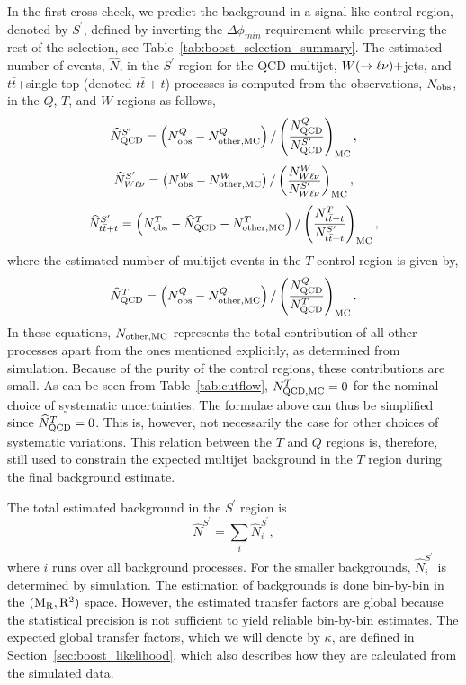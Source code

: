 In the first cross check, we predict the background in a signal-like control region, denoted by
$S^\prime$, defined by inverting the $\Delta\phi_{min}$ requirement while preserving the rest of the
selection, see Table~\ref{tab:boost_selection_summary}. 
The estimated number of events, $\widehat{N}$, in the $S^\prime$ region for the QCD multijet,
$W(\rightarrow \ell\nu)+$jets, and $t\bar{t}$+single top (denoted $t\bar{t}+t$) processes is
computed from the observations, $N_{\rm obs}$, in the $Q$, $T$, and $W$ regions as follows,
\begin{equation}
 \widehat{N}_{\rm QCD}^{S^\prime} = \left( N_{\rm obs}^{Q} - N_{{\rm other, MC}}^{Q} \right)  /
\left(
\frac{N_{\rm QCD}^{Q}}{N_{\rm QCD}^{S^\prime}} \right)_{\rm MC},
\label{eq:E1}
\end{equation}
\begin{equation}
 \widehat{N}_{W\ell\nu}^{S^\prime} = \left( N_{\rm obs}^{W} - N_{\rm other, MC}^{W} \right) /
\left(
\frac{N_{W\ell\nu}^{W}}{N_{W\ell\nu}^{S^\prime}} \right)_{\rm MC},
\label{eq:E2}
\end{equation}
\begin{equation}
  \widehat{N}_{t\bar{t}+t}^{S^\prime} = \left( N_{\rm obs}^{T} - \widehat{N}_{\rm QCD}^{T} - N_{\rm
other, MC}^{T}
\right) / \left( \frac{N_{t\bar{t}+t}^{T}} {N_{t\bar{t}+t}^{S^\prime}}\right)_{\rm MC},
\label{eq:E3}
\end{equation}
where the estimated number of multijet events in the $T$ control region is given by,
\begin{equation}
 \widehat{N}_{\rm QCD}^{T} = \left( N_{\rm obs}^{Q} - N_{\rm other, MC}^{Q} \right) /  \left(
\frac{N_{\rm QCD}^{Q}}{N_{\rm QCD}^{T}} \right)_{\rm MC}.
\label{eq:E4}
\end{equation}
In these equations, $N_{\rm other, MC}$ represents the total contribution of all other processes
apart from the ones mentioned explicitly, as determined from simulation. Because of the purity
of the control regions, these contributions are small. 
As can be seen from Table~\ref{tab:cutflow}, $N_{\rm QCD, MC}^{T} = 0$ for the nominal choice
of systematic uncertainties. The formulae above can thus be simplified since $\widehat{N}_{\rm
QCD}^{T} = 0$. This is, however, not necessarily the case for other choices of systematic
variations.
This relation between the $T$ and $Q$ regions is, therefore, still used to constrain the expected
multijet background in the $T$ region during the final background estimate. 

The total estimated background in the $S^\prime$ region is
\begin{equation}
  \hat{N}^{S^\prime} = \sum_i \hat{N}^{S^\prime}_i , 
\end{equation}
where $i$ runs over all background processes.  For the smaller backgrounds, $\hat{N}^{S^\prime}_i$
is determined by simulation. 
The estimation of backgrounds is done bin-by-bin in the $(\mathrm{M_R},\mathrm{R^2})$ space. 
However, the estimated transfer factors are global because the statistical precision is not
sufficient to yield reliable bin-by-bin estimates. The expected global transfer factors, which we
will denote by $\kappa$,  are defined in Section~\ref{sec:boost_likelihood}, which also describes
how they are calculated from the simulated data.

